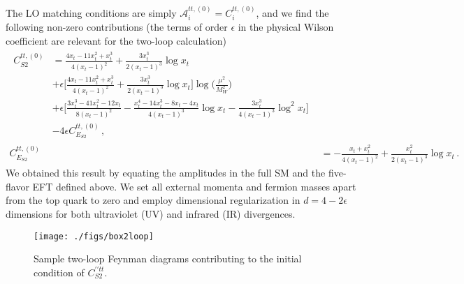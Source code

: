 \documentclass[letter,11pt,DIV=12,abstract=true,numbers=noenddot,titlepage=false,twocolumn=false,draft=false]{scrartcl}
\begin{document}
The LO matching conditions are simply ${\mathcal A}_{i}^{tt,(0)} =
C_{i}^{tt,(0)}$, and we find the following non-zero contributions (the
terms of order $\epsilon$ in the physical Wilson coefficient are
relevant for the two-loop calculation)
\begin{align}
\begin{split}
C_{S2}^{tt,(0)} & = \frac{4 x_t - 11 x_t^2 + x_t^3}{4(x_t-1)^2}
               + \frac{3 x_t^3}{2(x_t-1)^3} \log x_t \\
             & + \epsilon \bigg[ 
                 \frac{4 x_t - 11 x_t^2 + x_t^3}{4(x_t-1)^2}
               + \frac{3 x_t^3}{2(x_t-1)^3} \log x_t 
                 \bigg] \log\Big(\frac{\mu^2}{M_W^2}\Big) \\
             & + \epsilon \bigg[ 
                 \frac{3 x_t^3 - 41 x_t^2 - 12 x_t}{8(x_t - 1)^2}
               - \frac{x_t^4 - 14 x_t^3 - 8 x_t - 4 x_t}{4(x_t - 1)^3} \log x_t
               - \frac{3 x_t^3}{4(x_t - 1)^3}\log^2 x_t \bigg] \\
             & - 4 \epsilon C_{E_{S2}}^{tt,(0)} \,,
\end{split}\\
C_{E_{S2}}^{tt,(0)} & = - \frac{x_t + x_t^2}{4(x_t-1)^2}
               + \frac{x_t^2}{2(x_t-1)^3} \log x_t \,.
\end{align}
We obtained this result by equating the amplitudes in the full SM and
the five-flavor EFT defined above. We set all external momenta and
fermion masses apart from the top quark to zero and employ dimensional
regularization in $d=4-2\epsilon$ dimensions for both ultraviolet (UV)
and infrared (IR) divergences.

\begin{figure}[t]
        \centering
        \texttt{[image: ./figs/box2loop]}
        \caption{Sample two-loop Feynman diagrams contributing to the
          initial condition of $C_{S2}^{\prime \prime tt}$.
	\label{fig:2loop}}
\end{figure}
\end{document}
